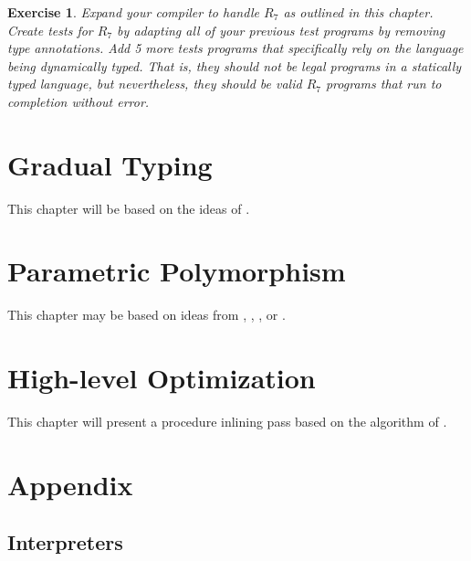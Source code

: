 \documentclass[11pt]{book}
\newtheorem{exercise}[theorem]{Exercise}
\begin{document}
\begin{exercise}\normalfont
Expand your compiler to handle $R_7$ as outlined in this chapter.
Create tests for $R_7$ by adapting all of your previous test programs
by removing type annotations. Add 5 more tests programs that
specifically rely on the language being dynamically typed. That is,
they should not be legal programs in a statically typed language, but
nevertheless, they should be valid $R_7$ programs that run to
completion without error.
\end{exercise}



\chapter{Gradual Typing}
\label{ch:gradual-typing}

This chapter will be based on the ideas of \citet{Siek:2006bh}.

\chapter{Parametric Polymorphism}
\label{ch:parametric-polymorphism}

This chapter may be based on ideas from \citet{Cardelli:1984aa},
\citet{Leroy:1992qb}, \citet{Shao:1997uj}, or \citet{Harper:1995um}.





\chapter{High-level Optimization}
\label{ch:high-level-optimization}

This chapter will present a procedure inlining pass based on the
algorithm of \citet{Waddell:1997fk}.


\chapter{Appendix}

\section{Interpreters}
\label{appendix:interp}
\end{document}
